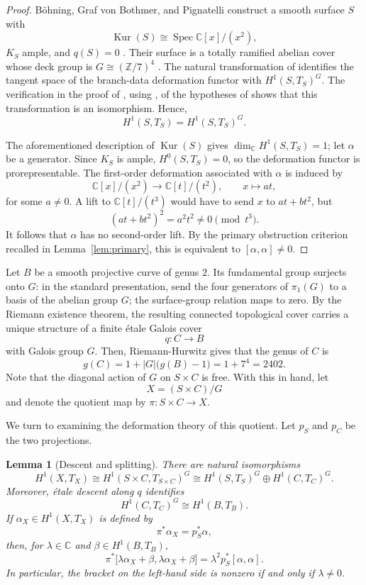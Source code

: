 \documentclass[10pt,a4paper]{amsart}
\numberwithin{equation}{section}
\newtheorem{lemma}[theorem]{Lemma}
\newcommand{\C}{\mathbb{C}}
\newcommand{\Z}{\mathbb{Z}}
\DeclareMathOperator{\Kur}{Kur}
\DeclareMathOperator{\Spec}{Spec}
\begin{document}
\begin{proof}
B\"ohning, Graf von Bothmer, and Pignatelli construct a smooth surface $S$ with
$$\Kur(S)\cong\Spec\C[x]/(x^2),$$
$K_S$ ample, and $q(S)=0$ \cite[Thm.~1.1 and Thms.~6.3, 6.5]{BVP}. Their surface is a totally ramified abelian cover whose deck group is $G\cong(\Z/7)^4$ \cite[Cor.~5.4]{BVP}. The natural transformation of \cite[Lem.~2.11]{BVP} identifies the tangent space of the branch-data deformation functor with $H^1(S,T_S)^G$. The verification in the proof of \cite[Thm.~5.5]{BVP}, using \cite[Thm.~3.19]{BVP}, of the hypotheses of \cite[Cor.~2.13]{BVP} shows that this transformation is an isomorphism. Hence,
$$H^1(S,T_S)=H^1(S,T_S)^G.$$

The aforementioned description of $\Kur(S)$ gives $\dim_{\C}H^1(S,T_S)=1$; let $\alpha$ be a generator. Since $K_S$ is ample, $H^0(S,T_S)=0$, so the deformation functor is prorepresentable. The first-order deformation associated with $\alpha$ is induced by
$$\C[x]/(x^2)\longrightarrow\C[t]/(t^2),
\qquad x\longmapsto at,$$
for some $a\neq0$. A lift to $\C[t]/(t^3)$ would have to send $x$ to $at+bt^2$, but
$$(at+bt^2)^2=a^2t^2\neq0\pmod{t^3}.$$
It follows that $\alpha$ has no second-order lift. By the primary obstruction criterion recalled in Lemma~\ref{lem:primary}, this is equivalent to $[\alpha,\alpha]\neq0$.
\end{proof}

Let $B$ be a smooth projective curve of genus $2$. Its fundamental group surjects onto $G$: in the standard presentation, send the four generators of $\pi_1(G)$ to a basis of the abelian group $G$; the surface-group relation maps to zero. By the Riemann existence theorem, the resulting connected topological cover carries a unique structure of a finite \'etale Galois cover
$$q\colon C\longrightarrow B$$
with Galois group $G$. Then, Riemann-Hurwitz gives that the genus of $C$ is 
$$g(C)=1+|G|\bigl(g(B)-1\bigr)=1+7^4=2402.$$
Note that the diagonal action of $G$ on $S\times C$ is free. With this in hand, let
$$X=(S\times C)/G$$
and denote the quotient map by $\pi\colon S\times C\to X$.

We turn to examining the deformation theory of this quotient. Let $p_S$ and $p_C$ be the two projections.


\begin{lemma}[Descent and splitting]\label{lem:descent}
There are natural isomorphisms
$$H^1(X,T_X)\cong H^1(S\times C,T_{S\times C})^G
\cong H^1(S,T_S)^G\oplus H^1(C,T_C)^G.
$$
Moreover, \'etale descent along $q$ identifies
$$
H^1(C,T_C)^G\cong H^1(B,T_B).
$$
If $\alpha_X\in H^1(X,T_X)$ is defined by
$$
\pi^*\alpha_X=p_S^*\alpha,
$$
then, for $\lambda\in\C$ and $\beta\in H^1(B,T_B)$,
\begin{equation}\label{eq:bracket-splitting}
\pi^*\bigl[\lambda\alpha_X+\beta,\lambda\alpha_X+\beta\bigr]
=\lambda^2p_S^*[\alpha,\alpha].
\end{equation}
In particular, the bracket on the left-hand side is nonzero if and only if $\lambda\neq0$.
\end{lemma}
\end{document}
